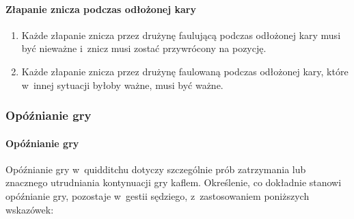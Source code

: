 \documentclass[12pt]{article}
\begin{document}
\paragraph{Złapanie znicza podczas odłożonej kary}

\begin{enumerate}
	\item
	      Każde złapanie znicza przez drużynę faulującą podczas odłożonej kary
	      musi być nieważne i~znicz musi zostać przywrócony na pozycję.
	\item
	      Każde złapanie znicza przez drużynę faulowaną podczas odłożonej kary,
	      które w~innej sytuacji byłoby ważne, musi być ważne.
\end{enumerate}

\subsubsection{Opóźnianie gry}

\paragraph{Opóźnianie gry}
Opóźnianie gry w~quidditchu dotyczy
szczególnie prób zatrzymania lub znacznego utrudniania kontynuacji gry
kaflem. Określenie, co dokładnie stanowi opóźnianie gry, pozostaje w~gestii sędziego, z~zastosowaniem poniższych wskazówek:
\end{document}

